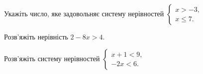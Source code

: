 \documentclass[12pt]{article}
\begin{document}
\begingroup\setcounter{zad}{0}
\providecommand{\trigStyle}[1]{#1}
\providecommand{\answerTableSmall}[5]{%
\begingroup\setlength{\tabcolsep}{2pt}\small\nmtSetCell
\begin{tabular}{|*{5}{>{\centering\arraybackslash}m{\nmtcellw}|}}
\hline
\rule[-0.2cm]{0pt}{0.6cm}\textbf{А} & \textbf{Б} & \textbf{В} & \textbf{Г} & \textbf{Д} \\
\hline
\rule[-0.4cm]{0pt}{0.9cm}#1 & \rule[-0.4cm]{0pt}{0.9cm}#2 & \rule[-0.4cm]{0pt}{0.9cm}#3 & \rule[-0.4cm]{0pt}{0.9cm}#4 & \rule[-0.4cm]{0pt}{0.9cm}#5 \\
\hline
\end{tabular}\endgroup}
\providecommand{\answerListVertical}[5]{\nmtOptions{#1}{#2}{#3}{#4}{#5}}

\par\vspace{0.2cm}


\begin{samepage}
\noindent\zadnum Укажіть число, яке задовольняє систему нерівностей $\begin{cases} x > -3, \\ x \leqslant 7. \end{cases}$ 

\nmtnobreak
{}
\par{}
\end{samepage}

\begin{samepage}
\noindent\zadnum Розв'яжіть нерівність $2 - 8x > 4$. 

\nmtnobreak
{}
\par{}
\end{samepage}

\begin{samepage}
\noindent\zadnum Розв'яжіть систему нерівностей $\begin{cases} x + 1 < 9, \\ -2x < 6. \end{cases}$ 

\nmtnobreak
{}
\par{}
\end{samepage}
\end{document}
